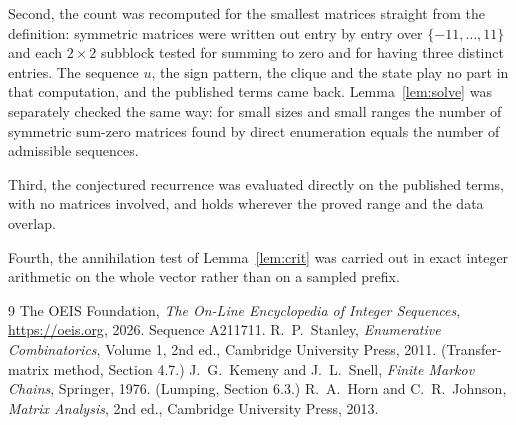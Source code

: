 \documentclass[11pt,a4paper]{article}
\theoremstyle{plain}
\theoremstyle{definition}
\begin{document}
Second, the count was recomputed for the smallest matrices straight from the definition:
symmetric matrices were written out entry by entry over $\{-11,\dots,11\}$ and each
$2\times2$ subblock tested for summing to zero and for having three distinct entries. The
sequence $u$, the sign pattern, the clique and the state play no part in that computation, and
the published terms came back. Lemma~\ref{lem:solve} was separately checked the same way: for
small sizes and small ranges the number of symmetric sum-zero matrices found by direct
enumeration equals the number of admissible sequences.

Third, the conjectured recurrence was evaluated directly on the published terms, with no
matrices involved, and holds wherever the proved range and the data overlap.

Fourth, the annihilation test of Lemma~\ref{lem:crit} was carried out in exact integer
arithmetic on the whole vector rather than on a sampled prefix.

\begin{thebibliography}{9}
 The OEIS Foundation, \emph{The On-Line Encyclopedia of Integer
Sequences}, \url{https://oeis.org}, 2026. Sequence A211711.
 R.~P.~Stanley, \emph{Enumerative Combinatorics}, Volume 1, 2nd ed.,
Cambridge University Press, 2011. (Transfer-matrix method, Section 4.7.)
 J.~G.~Kemeny and J.~L.~Snell, \emph{Finite Markov Chains}, Springer, 1976.
(Lumping, Section 6.3.)
 R.~A.~Horn and C.~R.~Johnson, \emph{Matrix Analysis}, 2nd ed., Cambridge
University Press, 2013.
\end{thebibliography}
\end{document}
